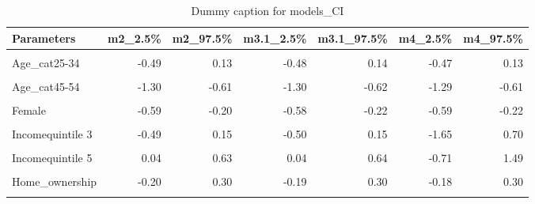 \begin{table}
\centering
\caption{Dummy caption for models_CI}
\centering
\fontsize{10}{12}\selectfont
\begin{tabular}[t]{lrrrrrr}
\toprule
Parameters & m2\_2.5\% & m2\_97.5\% & m3.1\_2.5\% & m3.1\_97.5\% & m4\_2.5\% & m4\_97.5\%\\
\midrule
\cellcolor{gray!10}{(Intercept)} & \cellcolor{gray!10}{-3.91} & \cellcolor{gray!10}{-0.11} & \cellcolor{gray!10}{-3.74} & \cellcolor{gray!10}{-0.86} & \cellcolor{gray!10}{-3.65} & \cellcolor{gray!10}{-0.59}\\
Age\_cat25-34 & -0.49 & 0.13 & -0.48 & 0.14 & -0.47 & 0.13\\
\cellcolor{gray!10}{Age\_cat35-44} & \cellcolor{gray!10}{-0.74} & \cellcolor{gray!10}{-0.12} & \cellcolor{gray!10}{-0.74} & \cellcolor{gray!10}{-0.10} & \cellcolor{gray!10}{-0.73} & \cellcolor{gray!10}{-0.12}\\
Age\_cat45-54 & -1.30 & -0.61 & -1.30 & -0.62 & -1.29 & -0.61\\
\cellcolor{gray!10}{Age\_cat55+} & \cellcolor{gray!10}{-0.94} & \cellcolor{gray!10}{-0.40} & \cellcolor{gray!10}{-0.95} & \cellcolor{gray!10}{-0.40} & \cellcolor{gray!10}{-0.93} & \cellcolor{gray!10}{-0.40}\\
Female & -0.59 & -0.20 & -0.58 & -0.22 & -0.59 & -0.22\\
\cellcolor{gray!10}{Incomequintile 2} & \cellcolor{gray!10}{-0.40} & \cellcolor{gray!10}{0.24} & \cellcolor{gray!10}{-0.41} & \cellcolor{gray!10}{0.23} & \cellcolor{gray!10}{-1.69} & \cellcolor{gray!10}{0.71}\\
Incomequintile 3 & -0.49 & 0.15 & -0.50 & 0.15 & -1.65 & 0.70\\
\cellcolor{gray!10}{Incomequintile 4} & \cellcolor{gray!10}{-0.03} & \cellcolor{gray!10}{0.56} & \cellcolor{gray!10}{-0.03} & \cellcolor{gray!10}{0.58} & \cellcolor{gray!10}{-1.54} & \cellcolor{gray!10}{0.82}\\
Incomequintile 5 & 0.04 & 0.63 & 0.04 & 0.64 & -0.71 & 1.49\\
\cellcolor{gray!10}{Higher\_edu} & \cellcolor{gray!10}{0.09} & \cellcolor{gray!10}{0.48} & \cellcolor{gray!10}{0.08} & \cellcolor{gray!10}{0.48} & \cellcolor{gray!10}{0.09} & \cellcolor{gray!10}{0.48}\\
Home\_ownership & -0.20 & 0.30 & -0.19 & 0.30 & -0.18 & 0.30\\
\cellcolor{gray!10}{Dwelling\_house} & \cellcolor{gray!10}{-0.41} & \cellcolor{gray!10}{0.05} & \cellcolor{gray!10}{-0.43} & \cellcolor{gray!10}{0.05} & \cellcolor{gray!10}{-0.42} & \cellcolor{gray!10}{0.05}\\

\end{tabular}
\end{table}
